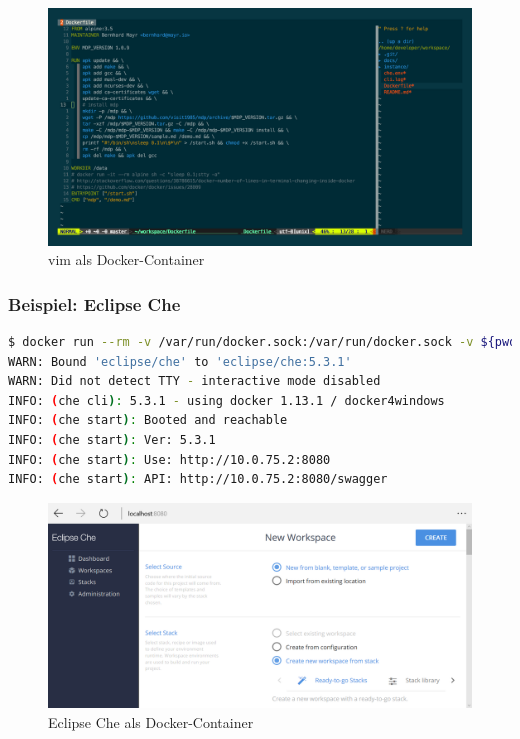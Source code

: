\begin{figure}[htbp]
    \centering
    \includegraphics[width=0.9\linewidth,clip]{images/vim-demo}
    \caption{vim als Docker-Container}
\label{fig:vim-demo}
\end{figure}

\subsubsection{Beispiel: Eclipse Che}
\begin{lstlisting}[caption=Docker-Kommando zum Starten von Eclipse Che, language=bash, label=lst:docker-run-eclipse-che]
$ docker run --rm -v /var/run/docker.sock:/var/run/docker.sock -v ${pwd}:/data eclipse/che start
WARN: Bound 'eclipse/che' to 'eclipse/che:5.3.1'
WARN: Did not detect TTY - interactive mode disabled
INFO: (che cli): 5.3.1 - using docker 1.13.1 / docker4windows
INFO: (che start): Booted and reachable
INFO: (che start): Ver: 5.3.1
INFO: (che start): Use: http://10.0.75.2:8080
INFO: (che start): API: http://10.0.75.2:8080/swagger
\end{lstlisting}

\begin{figure}[htbp]
    \centering
    \includegraphics[width=0.9\linewidth,clip]{images/eclipse-che-demo}
    \caption{Eclipse Che als Docker-Container}
\label{fig:eclipse-che-demo}
\end{figure}



